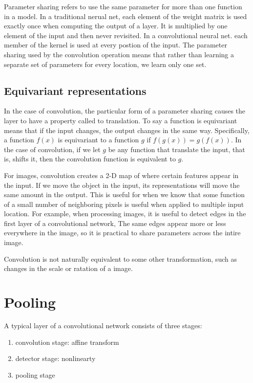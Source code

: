 Parameter sharing refers to use the same parameter for more than one function in a model.
In a traditional nerual net, each element of the weight matrix is used exactly once when computing the output of a layer.
It is multiplied by one element of the input and then never revisited.
In a convolutional neural net. each member of the kernel is used at every postion of the input.
The parameter sharing used by the convolution operation means that rather than learning a separate set of parameters for every location, we learn only one set.

\subsection{Equivariant representations}

In the case of convolution, the particular form of a parameter sharing causes the layer to have a property called  to translation.
To say a function is equivariant means that if the input changes, the output changes in the same way.
Specifically, a function $f(x)$ is equivariant to a function $g$ if $f(g(x)) = g(f(x))$.
In the case of convolution, if we let $g$ be any function that translate the input, that is, shifts it, then the convolution function is equivalent to $g$.

For images, convolution creates a 2-D map of where certain features appear in the input.
If we move the object in the input, its representations will move the same amount in the output.
This is useful for when we know that some function of a small number of neighboring pixels is useful when applied to multiple input location.
For example, when processing images, it is useful to detect edges in the first layer of a convolutional network,
The same edges appear more or less everywhere in the image, so it is practical to share parameters across the intire image.

Convolution is not naturally equivalent to some other transformation, such as changes in the scale or ratation of a image.




\section{ Pooling}

A typical layer of a convolutional network consists of three stages:
\begin{enumerate}
\item convolution stage: affine transform
\item detector stage: nonlinearty
\item pooling stage
\end{enumerate}


